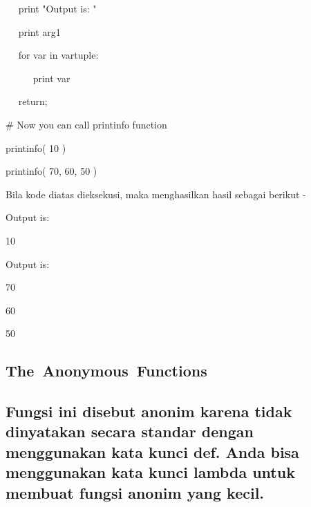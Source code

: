 \documentclass[a4paper,12pt]{report}
\begin{document}
\noindent 
 \hspace*{0.5in} ~~ print "Output is: " \par
\noindent 
 \hspace*{0.5in} ~~ print arg1 \par
\noindent 
 \hspace*{0.5in} ~~ for var in vartuple: \par
\noindent 
 \hspace*{0.5in} ~~~~~ print var \par
\noindent 
 \hspace*{0.5in} ~~ return; \par
\noindent 
 \hspace*{0.5in} \vspace{12pt}
\noindent 
 \hspace*{0.5in}  $  \#  $ Now you can call printinfo function \par
\noindent 
 \hspace*{0.5in} printinfo( 10 ) \par
\noindent 
 \hspace*{0.5in} printinfo( 70, 60, 50 ) \par
\begin{adjustwidth}{0.03in}{0.03in}
Bila kode diatas dieksekusi, maka menghasilkan hasil sebagai berikut -\end{adjustwidth}
 \par
\noindent 
 \hspace*{0.5in} Output is: \par
\noindent 
 \hspace*{0.5in} 10 \par
\noindent 
 \hspace*{0.5in} Output is: \par
\noindent 
 \hspace*{0.5in} 70 \par
\noindent 
 \hspace*{0.5in} 60 \par
\noindent 
 \hspace*{0.5in} 50 \par
\subsection*{The Anonymous Functions}
 \par
\subsection*{Fungsi ini disebut anonim karena tidak dinyatakan secara standar dengan menggunakan kata kunci def. Anda bisa menggunakan kata kunci lambda untuk membuat fungsi anonim yang kecil.}
 \par
\end{document}
